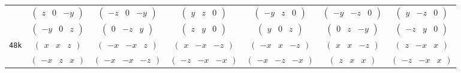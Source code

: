 \documentclass[fleqn,9pt,landscape]{jsarticle}
\begin{document}
\begin{center}
\begin{longtable}{ccccccc}
& $ \begin{pmatrix} z & 0 & - y \end{pmatrix} $ & $ \begin{pmatrix} - z & 0 & - y \end{pmatrix} $ & $ \begin{pmatrix} y & z & 0 \end{pmatrix} $ & $ \begin{pmatrix} - y & z & 0 \end{pmatrix} $ & $ \begin{pmatrix} - y & - z & 0 \end{pmatrix} $ & $ \begin{pmatrix} y & - z & 0 \end{pmatrix} $ \\
& $ \begin{pmatrix} - y & 0 & z \end{pmatrix} $ & $ \begin{pmatrix} 0 & - z & y \end{pmatrix} $ & $ \begin{pmatrix} z & y & 0 \end{pmatrix} $ & $ \begin{pmatrix} y & 0 & z \end{pmatrix} $ & $ \begin{pmatrix} 0 & z & - y \end{pmatrix} $ & $ \begin{pmatrix} - z & y & 0 \end{pmatrix} $ \\ \hline
{\tt 48k} & $ \begin{pmatrix} x & x & z \end{pmatrix} $ & $ \begin{pmatrix} - x & - x & z \end{pmatrix} $ & $ \begin{pmatrix} x & - x & - z \end{pmatrix} $ & $ \begin{pmatrix} - x & x & - z \end{pmatrix} $ & $ \begin{pmatrix} x & x & - z \end{pmatrix} $ & $ \begin{pmatrix} z & - x & x \end{pmatrix} $ \\
& $ \begin{pmatrix} - x & z & x \end{pmatrix} $ & $ \begin{pmatrix} - x & - x & - z \end{pmatrix} $ & $ \begin{pmatrix} - z & - x & - x \end{pmatrix} $ & $ \begin{pmatrix} - x & - z & - x \end{pmatrix} $ & $ \begin{pmatrix} z & x & x \end{pmatrix} $ & $ \begin{pmatrix} - z & - x & x \end{pmatrix} $ \\

\end{longtable}
\end{center}
\end{document}
